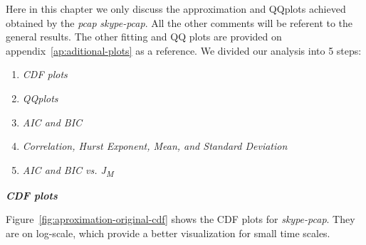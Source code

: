 Here in this chapter we only discuss the approximation and QQplots achieved obtained by the \textit{pcap} \textit{skype-pcap}. All the other comments will be referent to the general results. The other fitting and QQ plots are provided on appendix~\ref{ap:aditional-plots} as a reference. 
We divided our analysis into 5 steps:
\begin{enumerate}
    \item \textit{CDF plots}
    \item \textit{QQplots}
    \item \textit{AIC and BIC}
    \item \textit{Correlation, Hurst Exponent, Mean, and Standard Deviation} 
    \item  \textit{AIC and BIC vs. J\textsubscript{M} }
\end{enumerate} 

\smallskip \noindent \textbf{\textit{CDF plots}}

Figure~\ref{fig:aproximation-original-cdf}  shows the CDF plots for \textit{skype-pcap}. They are on log-scale, which provide a better visualization for small time scales. 

